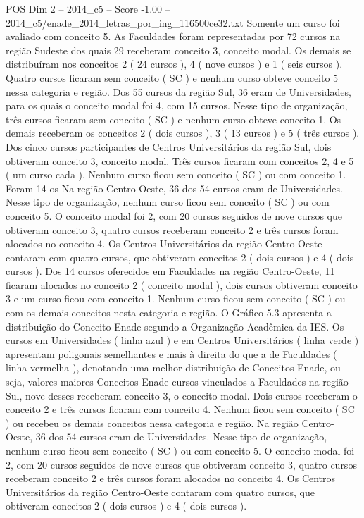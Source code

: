 \begin{textsample}{POS Dim 2 – 2014\_c5 – Score -1.00 – 2014\_c5/enade\_2014\_letras\_por\_ing\_116500ce32.txt}
Somente um curso foi avaliado com conceito 5.
As Faculdades foram representadas por 72 cursos na região Sudeste dos quais 29 receberam conceito 3, conceito modal.
Os demais se distribuíram nos conceitos 2 ( 24 cursos ), 4 ( nove cursos ) e 1 ( seis cursos ).
Quatro cursos ficaram sem conceito ( SC ) e nenhum curso obteve conceito 5 nessa categoria e região.
Dos 55 cursos da região Sul, 36 eram de Universidades, para os quais o conceito modal foi 4, com 15 cursos.
Nesse tipo de organização, três cursos ficaram sem conceito ( SC ) e nenhum curso obteve conceito 1.
Os demais receberam os conceitos 2 ( dois cursos ), 3 ( 13 cursos ) e 5 ( três cursos ).
Dos cinco cursos participantes de Centros Universitários da região Sul, dois obtiveram conceito 3, conceito modal.
Três cursos ficaram com conceitos 2, 4 e 5 ( um curso cada ).
Nenhum curso ficou sem conceito ( SC ) ou com conceito 1.
Foram 14 os Na região Centro-Oeste, 36 dos 54 cursos eram de Universidades.
Nesse tipo de organização, nenhum curso ficou sem conceito ( SC ) ou com conceito 5.
O conceito modal foi 2, com 20 cursos seguidos de nove cursos que obtiveram conceito 3, quatro cursos receberam conceito 2 e três cursos foram alocados no conceito 4.
Os Centros Universitários da região Centro-Oeste contaram com quatro cursos, que obtiveram conceitos 2 ( dois cursos ) e 4 ( dois cursos ).
Dos 14 cursos oferecidos em Faculdades na região Centro-Oeste, 11 ficaram alocados no conceito 2 ( conceito modal ), dois cursos obtiveram conceito 3 e um curso ficou com conceito 1.
Nenhum curso ficou sem conceito ( SC ) ou com os demais conceitos nesta categoria e região.
O Gráfico 5.3 apresenta a distribuição do Conceito Enade segundo a Organização Acadêmica da IES.
Os cursos em Universidades ( linha azul ) e em Centros Universitários ( linha verde ) apresentam poligonais semelhantes e mais à direita do que a de Faculdades ( linha vermelha ), denotando uma melhor distribuição de Conceitos Enade, ou seja, valores maiores Conceitos Enade cursos vinculados a Faculdades na região Sul, nove desses receberam conceito 3, o conceito modal.
Dois cursos receberam o conceito 2 e três cursos ficaram com conceito 4.
Nenhum ficou sem conceito ( SC ) ou recebeu os demais conceitos nessa categoria e região.
Na região Centro-Oeste, 36 dos 54 cursos eram de Universidades.
Nesse tipo de organização, nenhum curso ficou sem conceito ( SC ) ou com conceito 5.
O conceito modal foi 2, com 20 cursos seguidos de nove cursos que obtiveram conceito 3, quatro cursos receberam conceito 2 e três cursos foram alocados no conceito 4.
Os Centros Universitários da região Centro-Oeste contaram com quatro cursos, que obtiveram conceitos 2 ( dois cursos ) e 4 ( dois cursos ).

\end{textsample}
